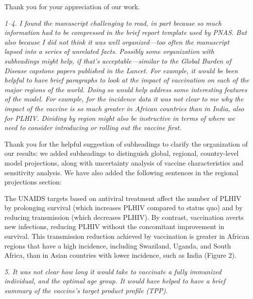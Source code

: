 \documentclass[12pt]{jpmletter}
\newenvironment{original}{\it}{}
\begin{document}
\begin{letter}{}
    Thank you for your appreciation of our work.

    \begin{original}
      1–4. I found the manuscript challenging to read, in part
      because so much information had to be compressed in the brief
      report template used by PNAS. But also because I did not think
      it was well organized—too often the manuscript lapsed into a
      series of unrelated facts. Possibly some organization with
      subheadings might help, if that's acceptable—similar to the
      Global Burden of Disease capstone papers published in the
      Lancet. For example, it would be been helpful to have brief
      paragraphs to look at the impact of vaccination on each of the
      major regions of the world. Doing so would help address some
      interesting features of the model. For example, for the
      incidence data it was not clear to me why the impact of the
      vaccine is so much greater in African countries than in India,
      also for PLHIV. Dividing by region might also be instructive in
      terms of where we need to consider introducing or rolling out
      the vaccine first.
    \end{original}
    
    Thank you for the helpful suggestion of subheadings to clarify the
    organization of our results: we added subheadings to distinguish
    global, regional, country-level model projections, along with
    uncertainty analysis of vaccine characteristics and sensitivity
    analysis.  We have also added the following sentences in the
    regional projections section:
    \begin{quoting}
      The UNAIDS targets based on antiviral treatment affect the
      number of PLHIV by prolonging survival (which increases PLHIV
      compared to status quo) and by reducing transmission (which
      decreases PLHIV). By contrast, vaccination averts new
      infections, reducing PLHIV without the concomitant improvement
      in survival.  This transmission reduction achieved by
      vaccination is greater in African regions that have a high
      incidence, including Swaziland, Uganda, and South Africa, than
      in Asian countries with lower incidence, such as India (Figure
      2).
    \end{quoting}
    
    \begin{original}
      5. It was not clear how long it would take to vaccinate
      a fully immunized individual, and the optimal age group. It
      would have helped to have a brief summary of the vaccine's
      target product profile (TPP).
    \end{original}
    

\end{letter}
\end{document}
